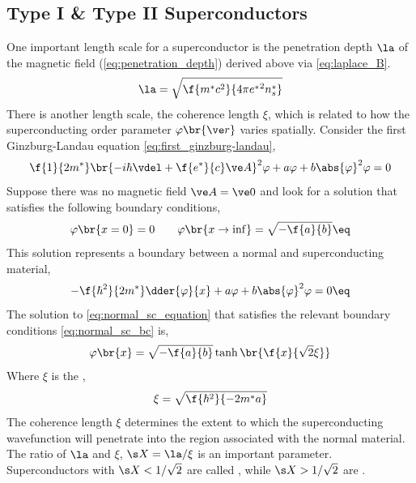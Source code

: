 \documentclass{article}
\newcommand{\vp}{\varphi}
\begin{document}
\subsection{Type I \& Type II Superconductors}
One important length scale for a superconductor is the penetration depth $\la$ of the magnetic field (\cref{eq:penetration_depth}) derived above via \cref{eq:laplace_B}.
\[ \la = \sqrt{\f{m^* c^2}{4 \pi {e^*}^2 n_s^*}} \]
There is another length scale, the coherence length $\xi$, which is related to how the superconducting order parameter $\vp\br{\ve r}$ varies spatially. Consider the first Ginzburg-Landau equation \cref{eq:first_ginzburg-landau},
\[ \f{1}{2m^{*}}\br{-i\hbar \vdel + \f{e^*}{c} \ve A}^2 \vp + a \vp + b \abs{\vp}^2\vp = 0 \]
Suppose there was no magnetic field $\ve A = \ve 0$ and look for a solution that satisfies the following boundary conditions,
\[ \vp\br{x = 0} = 0 \qquad \vp\br{x \to \inf} = \sqrt{-\f{a}{b}} \eq \label{eq:normal_sc_bc}\]
This solution represents a boundary between a normal and superconducting material,
\[ - \f{\hbar^2}{2m^*}\dder{\vp}{x} + a \vp + b \abs{\vp}^2 \vp = 0 \eq \label{eq:normal_sc_equation}\]
The solution to \cref{eq:normal_sc_equation} that satisfies the relevant boundary conditions \cref{eq:normal_sc_bc} is,
\[ \varphi\br{x} = \sqrt{-\f{a}{b}} \tanh\br{\f{x}{\sqrt{2}\xi}} \]
Where $\xi$ is the ,
\[ \xi = \sqrt{\f{\hbar^2}{-2 m^* a}} \]
The coherence length $\xi$ determines the extent to which the superconducting wavefunction will penetrate into the region associated with the normal material. The ratio of $\la$ and $\xi$, $\s X = \la / \xi$ is an important parameter. Superconductors with $\s X < 1/\sqrt{2}$ are called , while $\s X>1/\sqrt{2}$ are . \\
\end{document}
